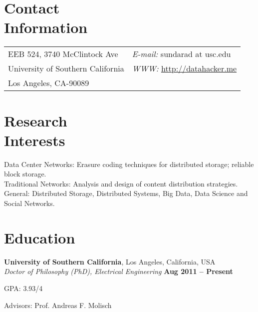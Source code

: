\documentclass[margin,line]{resume}
\begin{document}
\begin{resume}


\section{\mysidestyle Contact\\Information}


\begin{tabular}{@{}p{4in}p{5in}}
EEB 524, 3740 McClintock Ave &  {\it E-mail:}  sundarad at usc.edu\\
University of Southern California & {\it WWW:} \href{http://datahacker.me}{http://datahacker.me} \\
Los Angeles, CA-90089 &      \\
\end{tabular}

    \section{\mysidestyle Research\\Interests}
	Data Center Networks: Erasure coding techniques for distributed storage; reliable block storage. \\
	Traditional Networks: Analysis and design of content distribution strategies.\\
	General: Distributed Storage, Distributed Systems, Big Data, Data Science and Social Networks.
    \section{\mysidestyle Education}

    \textbf{University of Southern California}, Los Angeles, California, USA \\%
    \textsl{Doctor of Philosophy (PhD), Electrical Engineering} \hfill \textbf{ Aug 2011 -- Present}\vspace{-3mm}\\\vspace{-1mm}
    \begin{list2}
        \item GPA: 3.93/4
        \item Advisors:  Prof. Andreas F. Molisch 
    \end{list2}\vspace{-1.5mm}
    

\end{resume}
\end{document}
